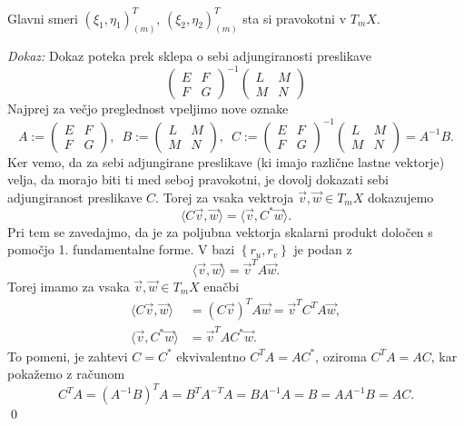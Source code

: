 \begin{izrek}
\label{izr_glavni_smeri_sta_si_pravokotni}
Glavni smeri $(\xi_1, \eta_1)_{(m)}^{T}$, $(\xi_2, \eta_2)_{(m)}^{T}$ sta si pravokotni v $T_m X$. 
\end{izrek}
\noindent
{\em Dokaz:\/}
Dokaz poteka prek sklepa o sebi adjungiranosti preslikave \begin{equation*}
  \begin{pmatrix}
    E & F \\
    F & G
    \end{pmatrix}^{-1}\begin{pmatrix}
    L & M \\
    M & N
    \end{pmatrix}
\end{equation*}  
Najprej za večjo preglednost vpeljimo nove oznake \begin{equation*}
A := \begin{pmatrix}
E & F \\
F & G
\end{pmatrix}, \,\,\, B := \begin{pmatrix}
L & M \\
M & N
\end{pmatrix}, \,\,\, C := \begin{pmatrix}
  E & F \\
  F & G
  \end{pmatrix}^{-1}\begin{pmatrix}
  L & M \\
  M & N
  \end{pmatrix} = A^{-1}B.
\end{equation*}  
Ker vemo, da za sebi adjungirane preslikave (ki imajo različne lastne vektorje) velja, da morajo biti ti med seboj pravokotni,
je dovolj dokazati sebi adjungiranost preslikave $C$. Torej za vsaka vektroja $\vec{v}, \vec{w} \in  T_m X$ dokazujemo \begin{equation*}
\langle C\vec{v}, \vec{w} \rangle = \langle \vec{v}, C^{*} \vec{w} \rangle.
\end{equation*}  
Pri tem se zavedajmo, da je za poljubna vektorja skalarni produkt določen s pomočjo 1. fundamentalne forme. V bazi $\left\{ r_u, r_v\right\} $ je podan z \begin{equation*}
  \langle \vec{v}, \vec{w} \rangle = \vec{v}^{T} A \vec{w}. 
\end{equation*}  
Torej imamo za vsaka $\vec{v}, \vec{w} \in T_mX$ enačbi \begin{align*}
  \langle C\vec{v}, \vec{w} \rangle &= (C\vec{v})^{T} A \vec{w} = \vec{v}^{T} C^{T} A \vec{w}, \\
  \langle \vec{v}, C^{*} \vec{w} \rangle  &= \vec{v}^{T} A C^{*} \vec{w}.
\end{align*}
To pomeni, je zahtevi $C = C^{*}$ ekvivalentno $C^{T}A= AC^{*}$, oziroma $C^{T}A = AC$, kar pokažemo z računom \begin{equation*}
C^{T}A = (A^{-1}B)^{T}A = B^{T}A^{-T}A = BA^{-1}A = B = A A^{-1} B = AC.
\end{equation*}  
\qed

